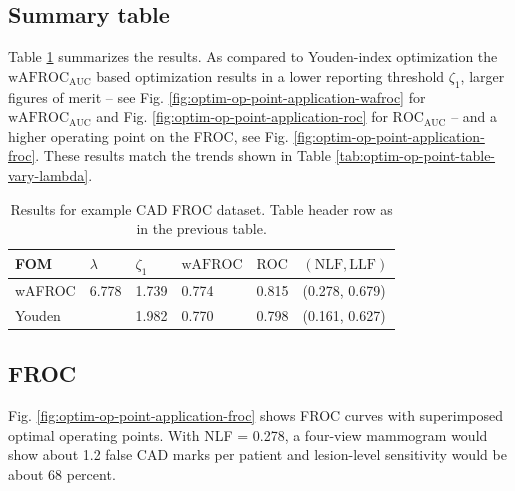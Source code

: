 \documentclass[
]{book}
\begin{document}
\hypertarget{summary-table-1}{%
\subsection{Summary table}\label{summary-table-1}}

Table \ref{tab:optim-op-point-table4} summarizes the results. As compared to Youden-index optimization the \(\text{wAFROC}_\text{AUC}\) based optimization results in a lower reporting threshold \(\zeta_1\), larger figures of merit -- see Fig. \ref{fig:optim-op-point-application-wafroc} for \(\text{wAFROC}_\text{AUC}\) and Fig. \ref{fig:optim-op-point-application-roc} for \(\text{ROC}_\text{AUC}\) -- and a higher operating point on the FROC, see Fig. \ref{fig:optim-op-point-application-froc}. These results match the trends shown in Table \ref{tab:optim-op-point-table-vary-lambda}.

\begin{table}

\caption{\label{tab:optim-op-point-table4}Results for example CAD FROC dataset. Table header row as in the previous table.}
\centering
\fontsize{10}{12}\selectfont
\begin{tabular}[t]{llllll}
\toprule
FOM & $\lambda$ & $\zeta_1$ & $\text{wAFROC}$ & $\text{ROC}$ & $\left( \text{NLF}, \text{LLF}\right)$\\
\midrule
wAFROC & 6.778 & 1.739 & 0.774 & 0.815 & (0.278, 0.679)\\
Youden &  & 1.982 & 0.770 & 0.798 & (0.161, 0.627)\\
\bottomrule
\end{tabular}
\end{table}

\hypertarget{froc-2}{%
\subsection{FROC}\label{froc-2}}

Fig. \ref{fig:optim-op-point-application-froc} shows FROC curves with superimposed optimal operating points. With NLF = 0.278, a four-view mammogram would show about 1.2 false CAD marks per patient and lesion-level sensitivity would be about 68 percent.
\end{document}

